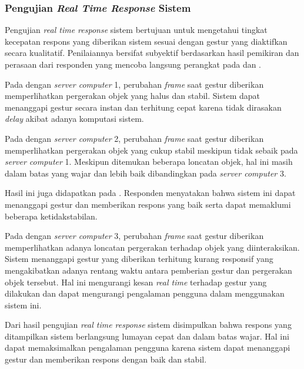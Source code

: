 \documentclass[conference]{IEEEtran}
\begin{document}
		\subsubsection{Pengujian \textit{Real Time Response} Sistem}
			Pengujian \textit{real time response} sistem bertujuan untuk mengetahui tingkat kecepatan respons yang diberikan sistem sesuai dengan gestur yang diaktifkan secara kualitatif. Penilaiannya bersifat subyektif berdasarkan hasil pemikiran dan perasaan dari responden yang mencoba langsung perangkat pada  dan .
			
			Pada  dengan \textit{server computer} 1, perubahan \textit{frame} saat gestur diberikan memperlihatkan pergerakan objek yang halus dan stabil. Sistem dapat menanggapi gestur secara instan dan terhitung cepat karena tidak dirasakan \textit{delay} akibat adanya komputasi sistem. 
			
			Pada  dengan \textit{server computer} 2, perubahan \textit{frame} saat gestur diberikan memperlihatkan pergerakan objek yang cukup stabil meskipun tidak sebaik pada \textit{server computer} 1. Meskipun ditemukan beberapa loncatan objek, hal ini masih dalam batas yang wajar dan lebih baik dibandingkan pada \textit{server computer} 3. 
			
			Hasil ini juga didapatkan pada . Responden menyatakan bahwa sistem ini dapat menanggapi gestur dan memberikan respons yang baik serta dapat memaklumi beberapa ketidakstabilan.
			
			Pada  dengan \textit{server computer} 3, perubahan \textit{frame} saat gestur diberikan memperlihatkan adanya loncatan pergerakan terhadap objek yang diinteraksikan. Sistem menanggapi gestur yang diberikan terhitung kurang responsif yang mengakibatkan adanya rentang waktu antara pemberian gestur dan pergerakan objek tersebut. Hal ini mengurangi kesan \textit{real time} terhadap gestur yang dilakukan dan dapat mengurangi pengalaman pengguna dalam menggunakan sistem ini. 
			
			Dari hasil pengujian \textit{real time response} sistem disimpulkan bahwa respons yang ditampilkan sistem berlangsung lumayan cepat dan dalam batas wajar. Hal ini dapat memaksimalkan pengalaman pengguna karena sistem dapat menanggapi gestur dan memberikan respons dengan baik dan stabil.
			
\end{document}
